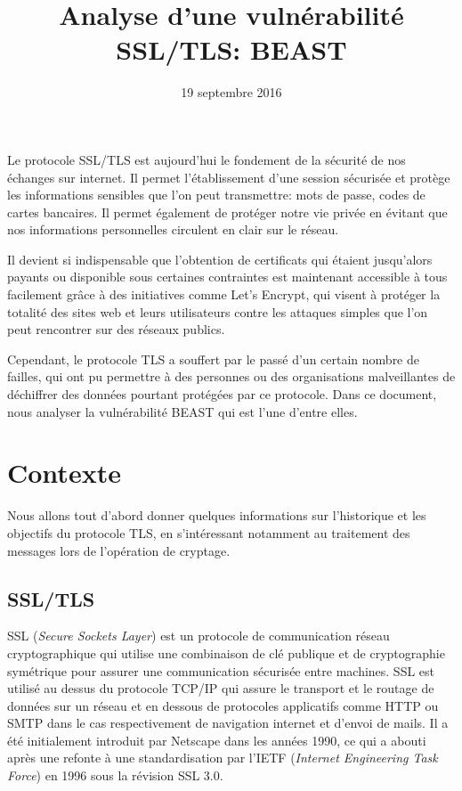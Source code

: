 \documentclass[a4paper,twoside]{article}
\title{\vspace{-12.5mm}\fontsize{16pt}{10pt}\selectfont\textbf{Analyse d'une vulnérabilité SSL/TLS: BEAST}\vspace{-1.75em}} %
\author{}
\date{\normalsize 19 septembre 2016}
\begin{document}
\maketitle %


Le protocole SSL/TLS est aujourd'hui le fondement de la sécurité de nos
échanges sur internet. Il permet l'établissement d'une session sécurisée et
protège les informations sensibles que l'on peut transmettre: mots de
passe, codes de cartes bancaires. Il permet également de protéger notre vie
privée en évitant que nos informations personnelles circulent en clair sur
le réseau.

Il devient si indispensable que l'obtention de certificats qui étaient
jusqu'alors payants ou disponible sous certaines contraintes est maintenant
accessible à tous facilement grâce à des initiatives comme Let's Encrypt,
qui visent à protéger la totalité des sites web et leurs utilisateurs
contre les attaques simples que l'on peut rencontrer sur des réseaux
publics.

Cependant, le protocole TLS a souffert par le passé d'un certain nombre de
failles, qui ont pu permettre à des personnes ou des organisations
malveillantes de déchiffrer des données pourtant protégées par ce
protocole. Dans ce document, nous analyser la vulnérabilité BEAST qui est
l'une d'entre elles.

\section{Contexte}

Nous allons tout d'abord donner quelques informations sur l'historique et
les objectifs du protocole TLS, en s'intéressant notamment au traitement des
messages lors de l'opération de cryptage.

\subsection{SSL/TLS}

SSL (\emph{Secure Sockets Layer}) est un protocole de communication réseau
cryptographique qui utilise une combinaison de clé publique et de
cryptographie symétrique pour assurer une communication sécurisée entre
machines. SSL est utilisé au dessus du protocole TCP/IP qui assure le
transport et le routage de données sur un réseau et en dessous de protocoles
applicatifs comme HTTP ou SMTP dans le cas respectivement de navigation
internet et d'envoi de mails. Il a été initialement introduit par Netscape
dans les années 1990, ce qui a abouti après une refonte à une standardisation par
l'IETF (\emph{Internet Engineering Task Force}) en 1996 sous la révision
SSL 3.0.
\end{document}
